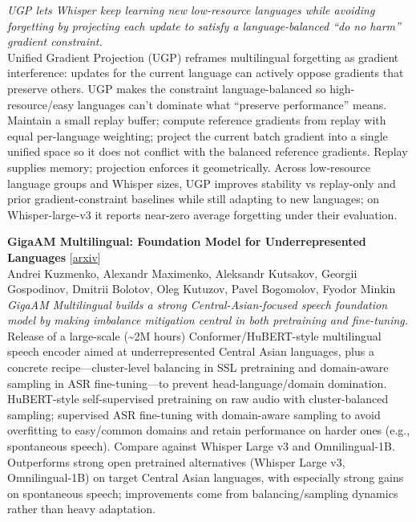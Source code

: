 \documentclass[12pt,letterpaper]{article}
\begin{document}
{\small\textit{UGP lets Whisper keep learning new low-resource languages while avoiding forgetting by projecting each update to satisfy a language-balanced ``do no harm'' gradient constraint.}}\\[1pt]
{\footnotesize Unified Gradient Projection (UGP) reframes multilingual forgetting as gradient interference: updates for the current language can actively oppose gradients that preserve others. UGP makes the constraint language-balanced so high-resource/easy languages can't dominate what ``preserve performance'' means. Maintain a small replay buffer; compute reference gradients from replay with equal per-language weighting; project the current batch gradient into a single unified space so it does not conflict with the balanced reference gradients. Replay supplies memory; projection enforces it geometrically. Across low-resource language groups and Whisper sizes, UGP improves stability vs replay-only and prior gradient-constraint baselines while still adapting to new languages; on Whisper-large-v3 it reports near-zero average forgetting under their evaluation.}

\medskip

{\small\textbf{GigaAM Multilingual: Foundation Model for Underrepresented Languages}} {\scriptsize[\href{https://arxiv.org/abs/2607.10371}{arxiv}]}\\
{\scriptsize Andrei Kuzmenko, Alexandr Maximenko, Aleksandr Kutsakov, Georgii Gospodinov, Dmitrii Bolotov, Oleg Kutuzov, Pavel Bogomolov, Fyodor Minkin}\\

{\small\textit{GigaAM Multilingual builds a strong Central-Asian-focused speech foundation model by making imbalance mitigation central in both pretraining and fine-tuning.}}\\[1pt]
{\footnotesize Release of a large-scale (\textasciitilde{}2M hours) Conformer/HuBERT-style multilingual speech encoder aimed at underrepresented Central Asian languages, plus a concrete recipe---cluster-level balancing in SSL pretraining and domain-aware sampling in ASR fine-tuning---to prevent head-language/domain domination. HuBERT-style self-supervised pretraining on raw audio with cluster-balanced sampling; supervised ASR fine-tuning with domain-aware sampling to avoid overfitting to easy/common domains and retain performance on harder ones (e.g., spontaneous speech). Compare against Whisper Large v3 and Omnilingual-1B. Outperforms strong open pretrained alternatives (Whisper Large v3, Omnilingual-1B) on target Central Asian languages, with especially strong gains on spontaneous speech; improvements come from balancing/sampling dynamics rather than heavy adaptation.}
\end{document}
